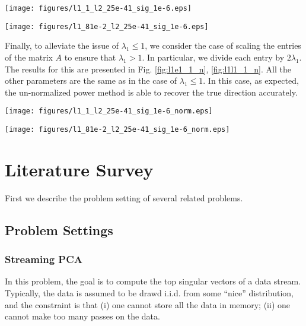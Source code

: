 \documentclass[10pt]{article}
\begin{document}
\begin{minipage}[t]{.5\linewidth}
\centering
\texttt{[image: figures/l1\_1\_l2\_25e-41\_sig\_1e-6.eps]}
\label{fig:l1e1_1}
\end{minipage}%
\begin{minipage}[t]{.5\linewidth}
\centering
\texttt{[image: figures/l1\_81e-2\_l2\_25e-41\_sig\_1e-6.eps]}
\label{fig:l1l1_1}
\end{minipage}

Finally, to alleviate the issue of $\lambda_1 \leq 1$, we consider the case of scaling the entries of the matrix $A$ to ensure that $\lambda_1 > 1$. In particular, we divide each entry by $2\lambda_1$. The results for this are presented in Fig. \ref{fig:l1e1_1_n}, \ref{fig:l1l1_1_n}. All the other parameters are the same as in the case of $\lambda_1 \leq 1$. In this case, as expected, the un-normalized power method is able to recover the true direction accurately. 

\begin{minipage}[t]{.5\linewidth}
\centering
\texttt{[image: figures/l1\_1\_l2\_25e-41\_sig\_1e-6\_norm.eps]}
\label{fig:l1e1_1_n}
\end{minipage}%
\begin{minipage}[t]{.5\linewidth}
\centering
\texttt{[image: figures/l1\_81e-2\_l2\_25e-41\_sig\_1e-6\_norm.eps]}
\label{fig:l1l1_1_n}
\end{minipage}

\section{Literature Survey}
First we describe the problem setting of several related problems. 

\subsection{Problem Settings}
\subsubsection{Streaming PCA}
In this problem, the goal is to compute the top singular vectors of a data stream. Typically, the data is assumed to be drawd i.i.d. from some ``nice'' distribution, and the constraint is that (i) one cannot store all the data in memory; (ii) one cannot make too many passes on the data.
\end{document}
